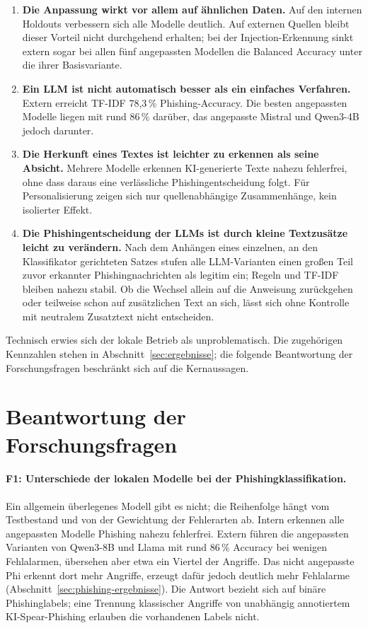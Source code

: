 \documentclass[12pt,twoside=false,a4paper,parskip]{scrbook}
\begin{document}
\begin{enumerate}
\item \textbf{Die Anpassung wirkt vor allem auf ähnlichen Daten.} Auf den internen Holdouts verbessern sich alle Modelle deutlich. Auf externen Quellen bleibt dieser Vorteil nicht durchgehend erhalten; bei der Injection-Erkennung sinkt extern sogar bei allen fünf angepassten Modellen die Balanced Accuracy unter die ihrer Basisvariante.
\item \textbf{Ein LLM ist nicht automatisch besser als ein einfaches Verfahren.} Extern erreicht TF-IDF 78{,}3\,\% Phishing-Accuracy. Die besten angepassten Modelle liegen mit rund 86\,\% darüber, das angepasste Mistral und Qwen3-4B jedoch darunter.
\item \textbf{Die Herkunft eines Textes ist leichter zu erkennen als seine Absicht.} Mehrere Modelle erkennen KI-generierte Texte nahezu fehlerfrei, ohne dass daraus eine verlässliche Phishingentscheidung folgt. Für Personalisierung zeigen sich nur quellenabhängige Zusammenhänge, kein isolierter Effekt.
\item \textbf{Die Phishingentscheidung der LLMs ist durch kleine Textzusätze leicht zu verändern.} Nach dem Anhängen eines einzelnen, an den Klassifikator gerichteten Satzes stufen alle LLM-Varianten einen großen Teil zuvor erkannter Phishingnachrichten als legitim ein; Regeln und TF-IDF bleiben nahezu stabil. Ob die Wechsel allein auf die Anweisung zurückgehen oder teilweise schon auf zusätzlichen Text an sich, lässt sich ohne Kontrolle mit neutralem Zusatztext nicht entscheiden.
\end{enumerate}

Technisch erwies sich der lokale Betrieb als unproblematisch. Die zugehörigen Kennzahlen stehen in Abschnitt~\ref{sec:ergebnisse}; die folgende Beantwortung der Forschungsfragen beschränkt sich auf die Kernaussagen.

\section{Beantwortung der Forschungsfragen}\label{sec:beantwortung}

\paragraph{F1: Unterschiede der lokalen Modelle bei der Phishingklassifikation.}
Ein allgemein überlegenes Modell gibt es nicht; die Reihenfolge hängt vom Testbestand und von der Gewichtung der Fehlerarten ab. Intern erkennen alle angepassten Modelle Phishing nahezu fehlerfrei. Extern führen die angepassten Varianten von Qwen3-8B und Llama mit rund 86\,\% Accuracy bei wenigen Fehlalarmen, übersehen aber etwa ein Viertel der Angriffe. Das nicht angepasste Phi erkennt dort mehr Angriffe, erzeugt dafür jedoch deutlich mehr Fehlalarme (Abschnitt~\ref{sec:phishing-ergebnisse}). Die Antwort bezieht sich auf binäre Phishinglabels; eine Trennung klassischer Angriffe von unabhängig annotiertem KI-Spear-Phishing erlauben die vorhandenen Labels nicht.
\end{document}
